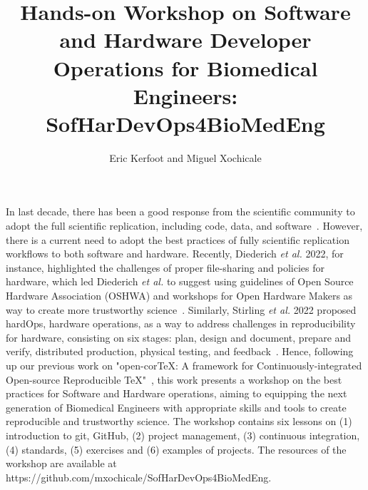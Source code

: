 \documentclass{article}
\title{
Hands-on Workshop on Software and Hardware Developer Operations for Biomedical Engineers: SofHarDevOps4BioMedEng %
}
\author{
Eric Kerfoot and Miguel Xochicale
}
\date{\DTMNow}
\begin{document}
\maketitle
In last decade, there has been a good response from the scientific community to adopt the full scientific replication, including code, data, and software~\cite{peng2011}. 
However, there is a current need to adopt the best practices of fully scientific replication workflows to both software and hardware.
Recently, Diederich \textit{et al.} 2022, for instance, highlighted the challenges of proper file-sharing and policies for hardware, which led Diederich \textit{et al.} to suggest using guidelines of Open Source Hardware Association (OSHWA) and workshops for Open Hardware Makers as way to create more trustworthy science~\cite{Diederich2022}.
Similarly, Stirling \textit{et al.} 2022 proposed hardOps, hardware operations, as a way to address challenges in reproducibility for hardware, consisting on six stages: plan, design and document, prepare and verify, distributed production, physical testing, and feedback~\cite{stirling2022}. 
Hence, following up our previous work on "open-corTeX: A framework for Continuously-integrated Open-source Reproducible TeX"~\cite{xochicale2020}, this work presents a workshop on the best practices for Software and Hardware operations, aiming to equipping the next generation of Biomedical Engineers with appropriate skills and tools to create reproducible and trustworthy science.
The workshop contains six lessons on (1) introduction to git, GitHub, (2) project management, (3) continuous integration, (4) standards, (5) exercises and (6) examples of projects.
The resources of the workshop are available at https://github.com/mxochicale/SofHarDevOps4BioMedEng.

\newpage
%

\end{document}

